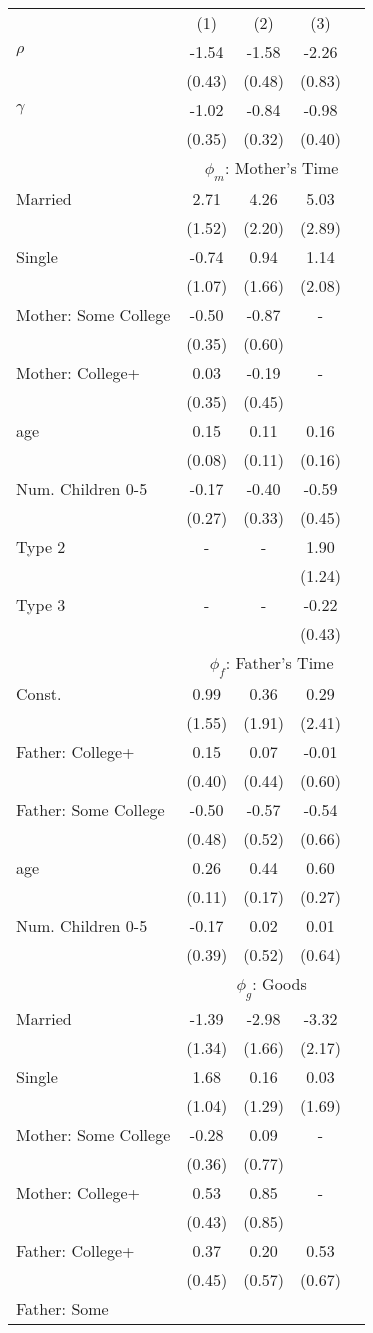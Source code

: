 \begin{tabular}{lcccc}\\\toprule
&(1)&(2)&(3)&\\\cmidrule(r){2-5}$\rho$&-1.54&-1.58&-2.26&\\
&(0.43)&(0.48)&(0.83)&\\
$\gamma$&-1.02&-0.84&-0.98&\\
&(0.35)&(0.32)&(0.40)&\\
& \multicolumn{4}{c}{$\phi_{m}$: Mother's Time}\\\cmidrule(r){2-5}Married&2.71&4.26&5.03&\\&(1.52)&(2.20)&(2.89)&\\Single&-0.74&0.94&1.14&\\&(1.07)&(1.66)&(2.08)&\\Mother: Some College&-0.50&-0.87&-&\\&(0.35)&(0.60)&&\\Mother: College+&0.03&-0.19&-&\\&(0.35)&(0.45)&&\\age&0.15&0.11&0.16&\\&(0.08)&(0.11)&(0.16)&\\Num. Children 0-5&-0.17&-0.40&-0.59&\\&(0.27)&(0.33)&(0.45)&\\Type 2&-&-&1.90&\\&&&(1.24)&\\Type 3&-&-&-0.22&\\&&&(0.43)&\\& \multicolumn{4}{c}{$\phi_{f}$: Father's Time}\\\cmidrule(r){2-5}Const.&0.99&0.36&0.29&\\&(1.55)&(1.91)&(2.41)&\\Father: College+&0.15&0.07&-0.01&\\&(0.40)&(0.44)&(0.60)&\\Father: Some College&-0.50&-0.57&-0.54&\\&(0.48)&(0.52)&(0.66)&\\age&0.26&0.44&0.60&\\&(0.11)&(0.17)&(0.27)&\\Num. Children 0-5&-0.17&0.02&0.01&\\&(0.39)&(0.52)&(0.64)&\\& \multicolumn{4}{c}{$\phi_{g}$: Goods}\\\cmidrule(r){2-5}Married&-1.39&-2.98&-3.32&\\&(1.34)&(1.66)&(2.17)&\\Single&1.68&0.16&0.03&\\&(1.04)&(1.29)&(1.69)&\\Mother: Some College&-0.28&0.09&-&\\&(0.36)&(0.77)&&\\Mother: College+&0.53&0.85&-&\\&(0.43)&(0.85)&&\\Father: College+&0.37&0.20&0.53&\\&(0.45)&(0.57)&(0.67)&\\Father: Some 
\end{tabular}
